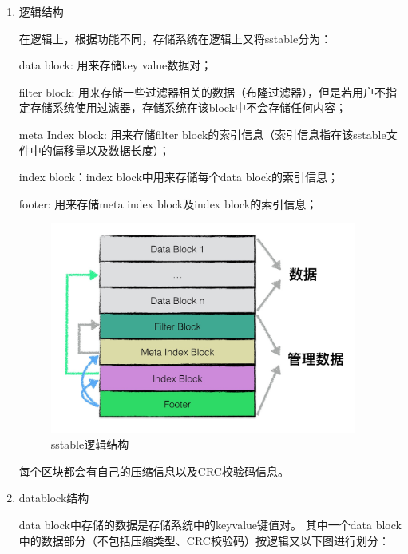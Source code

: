 \begin{enumerate}
\begin{enumerate}
					\item 逻辑结构
	
					在逻辑上，根据功能不同，存储系统在逻辑上又将sstable分为：
	
	data block: 用来存储key value数据对；
	
	filter block: 用来存储一些过滤器相关的数据（布隆过滤器），但是若用户不指定存储系统使用过滤器，存储系统在该block中不会存储任何内容；
	
	meta Index block: 用来存储filter block的索引信息（索引信息指在该sstable文件中的偏移量以及数据长度）；
	
	index block：index block中用来存储每个data block的索引信息；
	
	footer: 用来存储meta index block及index block的索引信息；
	
	\begin{figure}[H]
		\centering
		\includegraphics[width=0.95\textwidth]{images/sstable_logic.jpeg}
		\caption{sstable逻辑结构}
		\label{sstable_logic}
	\end{figure}
	
				每个区块都会有自己的压缩信息以及CRC校验码信息。
	
					\item datablock结构
	
					data block中存储的数据是存储系统中的keyvalue键值对。
					其中一个data block中的数据部分（不包括压缩类型、CRC校验码）按逻辑又以下图进行划分：
					

\end{enumerate}
\end{enumerate}
